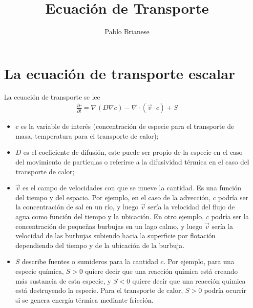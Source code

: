 \documentclass{article}
\title{Ecuación de Transporte}
\author{Pablo Brianese}
\begin{document}
  \maketitle
  \section{La ecuación de transporte escalar}
  La ecuación de transporte se lee
  \begin{align}
    \frac{\partial c}{\partial t} = \nabla (D \nabla c) - \nabla \cdot (\vec{v} \cdot c) + S
  \end{align}
  \begin{itemize}
    \item \(c\) es la variable de interés (concentración de especie para el transporte de masa, temperatura para el transporte de calor);
    \item \(D\) es el coeficiente de difusión, este puede ser propio de la especie en el caso del movimiento de partículas o referirse a la difusividad térmica en el caso del transporte de calor;
    \item \(\vec{v}\) es el campo de velocidades con que se mueve la cantidad.
    Es una función del tiempo y del espacio.
    Por ejemplo, en el caso de la advección,
    \(c\) podría ser la concentración de sal en un río, y luego \(\vec{v}\) sería la velocidad del flujo de agua como función del tiempo y la ubicación.
    En otro ejemplo, \(c\) podría ser la concentración de pequeñas burbujas en un lago calmo, y luego \(\vec{v}\) sería la velocidad de las burbujas subiendo hacia la superficie por flotación dependiendo del tiempo y de la ubicación de la burbuja.
    \item \(S\) describe fuentes o sumideros para la cantidad \(c\).
    Por ejemplo, para una especie química, \(S > 0\) quiere decir que una reacción química está creando más sustancia de esta especie, y \(S < 0\) quiere decir que una reacción química está destruyendo la especie.
    Para el transporte de calor, \(S > 0\) podría ocurrir si se genera energía térmica mediante fricción.
  \end{itemize}
  
\end{document}
